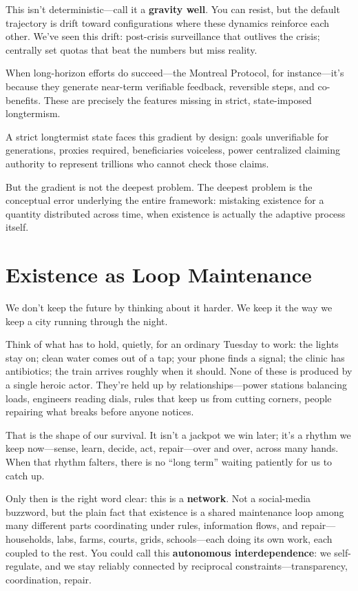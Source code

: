 \documentclass[12pt,a4paper]{article}
\begin{document}
This isn't deterministic---call it a \textbf{gravity well}. You can resist, but the default trajectory is drift toward configurations where these dynamics reinforce each other. We've seen this drift: post-crisis surveillance that outlives the crisis; centrally set quotas that beat the numbers but miss reality.

When long-horizon efforts do succeed---the Montreal Protocol, for instance---it's because they generate near-term verifiable feedback, reversible steps, and co-benefits. These are precisely the features missing in strict, state-imposed longtermism.

A strict longtermist state faces this gradient by design: goals unverifiable for generations, proxies required, beneficiaries voiceless, power centralized claiming authority to represent trillions who cannot check those claims.

But the gradient is not the deepest problem. The deepest problem is the conceptual error underlying the entire framework: mistaking existence for a quantity distributed across time, when existence is actually the adaptive process itself.

\section{Existence as Loop Maintenance}

We don't keep the future by thinking about it harder. We keep it the way we keep a city running through the night.

Think of what has to hold, quietly, for an ordinary Tuesday to work: the lights stay on; clean water comes out of a tap; your phone finds a signal; the clinic has antibiotics; the train arrives roughly when it should. None of these is produced by a single heroic actor. They're held up by relationships---power stations balancing loads, engineers reading dials, rules that keep us from cutting corners, people repairing what breaks before anyone notices.

That is the shape of our survival. It isn't a jackpot we win later; it's a rhythm we keep now---sense, learn, decide, act, repair---over and over, across many hands. When that rhythm falters, there is no ``long term'' waiting patiently for us to catch up.

Only then is the right word clear: this is a \textbf{network}. Not a social-media buzzword, but the plain fact that existence is a shared maintenance loop among many different parts coordinating under rules, information flows, and repair---households, labs, farms, courts, grids, schools---each doing its own work, each coupled to the rest. You could call this \textbf{autonomous interdependence}: we self-regulate, and we stay reliably connected by reciprocal constraints---transparency, coordination, repair.
\end{document}
